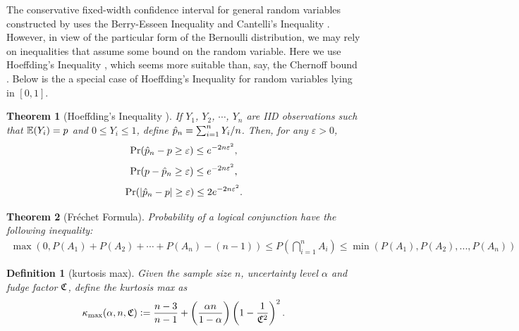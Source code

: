 \documentclass{iitthesis}
\newtheorem{theorem}{Theorem}[section]
\newtheorem{defn}{Definition}[theorem]
\begin{document}
The conservative fixed-width confidence interval for general random variables constructed by  \cite{HJLO12} uses the Berry-Esseen Inequality \cite[Section 4.1]{LB10} and Cantelli's Inequality \cite[Section 6.1]{LB10}. However, in view of the particular form of the Bernoulli distribution, we may rely on inequalities that assume some bound on the random variable.  Here we use Hoeffding's Inequality \cite{H63}, which seems more suitable than, say, the Chernoff bound \cite{chernoff52}.  Below is the a special case of Hoeffding's Inequality for random variables lying in $[0,1]$.
\begin{theorem}[Hoeffding's Inequality {\cite{H63}}] \label{hoeff}
If $Y_1$, $Y_2$, $\cdots$, $Y_n$ are IID observations such that $\mathbb{E}(Y_i)=p$ and $0 \leq Y_i \leq 1$, define $\hat{p}_n=\sum_{i=1}^n Y_i/n$. Then, for any $\varepsilon>0$, 
$$\Pr(\hat{p}_n-p \geq \varepsilon) \leq e^{-2n\varepsilon^2},$$
$$\Pr(p-\hat{p}_n \geq \varepsilon) \leq e^{-2n\varepsilon^2},$$
$$\Pr(\left \lvert \hat{p}_n-p \right \rvert \geq \varepsilon) \leq 2e^{-2n\varepsilon^2}.$$
\end{theorem}
 
\begin{theorem}[Fr\'{e}chet Formula] \cite{Frechet35}
Probability of a logical conjunction have the following inequality:
\begin{align}
\max(0, P(A_1) + P(A_2)+\cdots +P(A_n)-(n -1)) \leq P\left(\bigcap_{i=1}^n A_i\right)\leq \min(P(A_1), P(A_2), ..., P(A_n))
\end{align}
\end{theorem}


\begin{defn}[kurtosis max]
Given the sample size $n$, uncertainty level $\alpha$ and fudge factor $\mathfrak{C}$, define the kurtosis max as
\begin{equation}
\label{def:kmax}
\kappa_{\max} (\alpha, n,\mathfrak{C}):= \frac{n-3}{n-1} + \left(\frac{ \alpha n}{1-\alpha}\right) \left(1 - \frac{1}{\mathfrak{C}^2}\right)^2.
\end{equation}
\end{defn}
\end{document}
